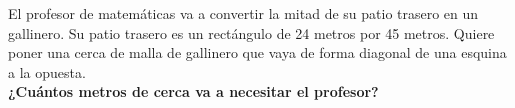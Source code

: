 \question[15]  El profesor de matemáticas va a convertir la mitad de su patio trasero en un gallinero.
Su patio trasero es un rectángulo de 24 metros por 45 metros.
Quiere poner una cerca de malla de gallinero que vaya de forma diagonal de una esquina a la opuesta.\\
\textbf{¿Cuántos metros de cerca va a necesitar el profesor?}